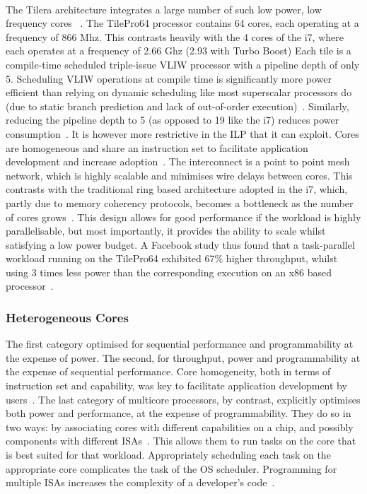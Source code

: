 \paragraph{} The Tilera architecture  integrates a large number of such low power, 
low frequency cores ~\cite{wentzlaff2007tile}. The TilePro64 processor contains 
64 cores, each operating at a frequency of 866 Mhz. This contrasts heavily
with the 4 cores of the i7, where each operates at a frequency of 2.66 Ghz (2.93 with
Turbo Boost)  Each tile is a compile-time scheduled triple-issue VLIW processor with 
a pipeline depth of only 5. Scheduling VLIW operations at compile time is 
significantly more power efficient
than relying on dynamic scheduling like most superscalar processors do (due to
static branch prediction and lack of out-of-order execution)~\cite{hennessy2006comparchquantitative}. Similarly,
reducing the pipeline depth to 5 (as opposed to 19 like the i7) reduces
power consumption~\cite{Borkar:2007:TCC:1278480.1278667}. 
It is however more restrictive in the ILP that it can exploit. Cores are homogeneous and share 
an instruction set to facilitate application development and increase adoption~\cite{wentzlaff2007tile}. The interconnect is a point to point mesh network, which
is highly scalable and minimises wire delays between cores. This
contrasts with the traditional ring based architecture adopted in the i7,  
which, partly due to memory coherency protocols, becomes a bottleneck
as the number of cores grows~\cite{1431574}. This design allows for good performance
if the workload is highly parallelisable, but most
importantly, it provides the ability to scale whilst satisfying a low power budget. A Facebook study thus found that a task-parallel workload running on the TilePro64 exhibited
67\% higher throughput, whilst using 3 times less power than the corresponding
execution on an x86 based processor~\cite{berezecki2011manycore}. 

\subsubsection{Heterogeneous Cores} 
The first category optimised for 
sequential performance and programmability at the expense of power. The second, 
for throughput, power and programmability at the expense of sequential performance. 
Core homogeneity, both in terms of instruction set and capability,
was key to facilitate application development by users~\cite{balakrishnan2005impactperfasym}. The last category
of multicore processors, by contrast, explicitly optimises both
power and performance, at the expense of programmability. They do so in two ways: 
by associating cores with different capabilities on a chip, and possibly components
with different ISAs~\cite{kumar:2004:SHM:998680.1006707,5695539,Kumar:2005:HCM:1100859.1100890,5695539,5695539,FSSP:09}. This allows them to run tasks on the core
that is best suited for that workload. Appropriately scheduling each 
task on the appropriate core complicates the task of the OS scheduler.
Programming for multiple ISAs increases the complexity of a developer's code~\cite{McIlroy:2010:HRS:1869459.1869478}. 

